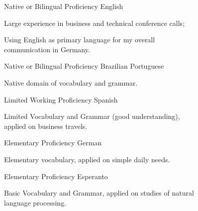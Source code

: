 \noindent
\vspace{-0.1cm}
\begin{multicols}{2}
\begin{cventries}
\noindent
\cventry
        {Native or Bilingual Proficiency}
        {English}{}{}
        {
         \begin{cvitems}
           \item {Large experience in business and technical conference calls;}
           \item {Using English as primary
           language for my overall\\communication in Germany.}
          \end{cvitems}
        }
\cventry
        {Native or Bilingual Proficiency}
        {Brazilian Portuguese}{}{}
        {
         \begin{cvitems}
           \item {Native domain of vocabulary and grammar.\\}
          \end{cvitems}
        }
\cventry
        {Limited Working Proficiency}
        {Spanish}{}{}
        {
         \begin{cvitems}
           \item {Limited Vocabulary and Grammar (good understanding),\\applied on business travels.}
          \end{cvitems}
        }
\end{cventries}
\columnbreak
\begin{cventries}
\noindent
\cventry
        {Elementary Proficiency}
        {German}{}{}
        {
         \begin{cvitems}
           \item {Elementary vocabulary, applied on simple daily needs.}
          \end{cvitems}
        }
\cventry
        {Elementary Proficiency}
        {Esperanto}{}{}
        {
         \begin{cvitems}
           \item {Basic Vocabulary and Grammar, applied on studies of natural \\language processing.}
          \end{cvitems}
        }
\end{cventries}
\end{multicols}


